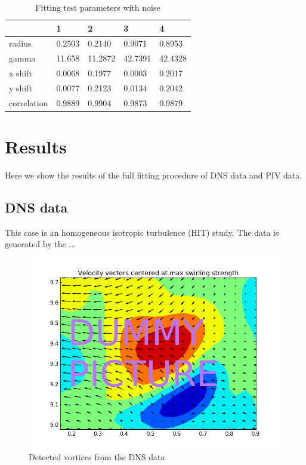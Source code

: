 \documentclass[12pt, a4paper, openany]{memoir}
\begin{document}
\begin{table}[h]
	\centering
	\caption{Fitting test parameters with noise}
	\vspace{10px}
	\label{tb:fittingtestnoise}
	\begin{tabular}{l|l|l|l|l}
		& 1      & 2 & 3 & 4 \\
		\hline
		radius      & 0.2503   & 0.2140 & 0.9071 & 0.8953  \\
		gamma       & 11.658 & 11.2872 & 42.7391 & 42.4328 \\
		x shift     & 0.0068  & 0.1977 & 0.0003 & 0.2017 \\
		y shift     & 0.0077  & 0.2123 & 0.0134 & 0.2042 \\ 
		correlation & 0.9889   & 0.9904 & 0.9873 & 0.9879 \\
	\end{tabular}
\end{table}


\chapter{Results}
Here we show the results of the full fitting procedure of DNS data and PIV data.

\section{DNS data}
This case is an homogeneous isotropic turbulence (HIT) study. The data is generated by the ...

\begin{figure}[h]
	\centering
	\includegraphics[scale=0.5]{figure/dummy.png}
	\caption{Detected vortices from the DNS data}
	\label{fig:detectionDNS}
\end{figure}
\end{document}
